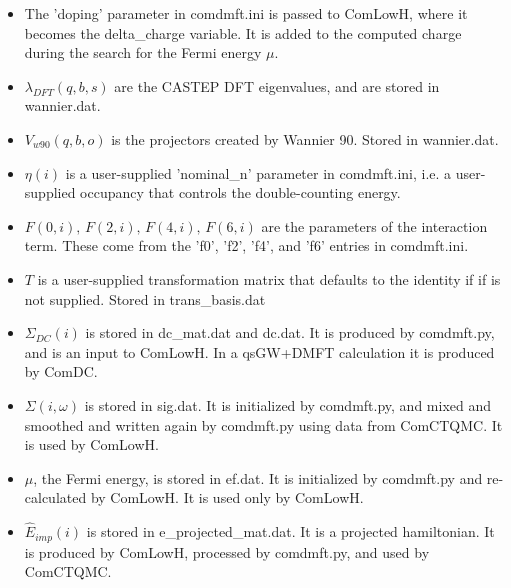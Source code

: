 \documentclass[aps,prb,singlecolumn,preprintnumbers,amsmath,amssymb]{revtex4}
\begin{document}
\begin{itemize}
\item The 'doping' parameter in comdmft.ini is passed to ComLowH, where it becomes the delta\_charge variable.  It is added to the computed charge during the search for the Fermi energy $\mu$.   
\item $\lambda_{DFT}(q,b,s)$ are the CASTEP DFT eigenvalues, and are stored in wannier.dat.
\item $V_{w90}(q,b,o)$ is the projectors created by Wannier 90.  Stored in wannier.dat.
\item $\eta(i)$ is a user-supplied 'nominal\_n' parameter in comdmft.ini, i.e. a user-supplied occupancy that controls the double-counting energy.
\item $F(0,i),\,F(2,i),\,F(4,i),\,F(6,i)$ are the parameters of the interaction term. These come from the 'f0', 'f2', 'f4', and 'f6' entries in comdmft.ini.
\item $T$ is a  user-supplied transformation matrix that defaults to the identity if if is not supplied.  Stored in trans\_basis.dat
\item $\Sigma_{DC}(i)$ is stored in dc\_mat.dat and dc.dat. It is produced by comdmft.py, and is an input to ComLowH. In a qsGW+DMFT calculation it is produced by ComDC.
\item $\Sigma(i,\omega)$ is stored in sig.dat. It is initialized by comdmft.py, and mixed and smoothed  and written again by comdmft.py using data from ComCTQMC.  It is used by ComLowH.
\item $\mu$, the Fermi energy, is stored in ef.dat.  It is initialized by comdmft.py and re-calculated by ComLowH.  It is used only  by ComLowH.
\item $\hat{E}_{imp}(i)$ is stored in e\_projected\_mat.dat. It is  a projected hamiltonian. It is produced by ComLowH, processed by comdmft.py, and used by ComCTQMC.

\end{itemize}
\end{document}
